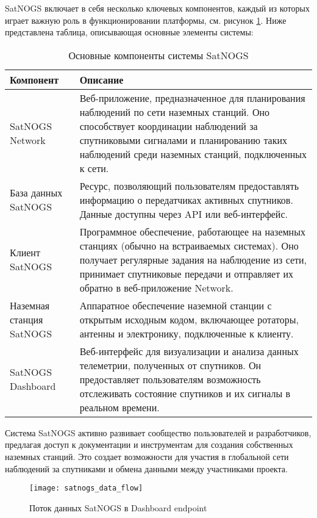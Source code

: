 SatNOGS включает в себя несколько ключевых компонентов, каждый из которых
играет важную роль в функционировании платформы, см. рисунок
\ref{fig:satnogs_data_flow}.
Ниже представлена таблица, описывающая основные элементы системы:

\begin{table}[htbp]
	\centering
	\begin{tabular}{|l|p{10cm}|}
		\hline \textbf{Компонент} & \textbf{Описание}
		\\ \hline SatNOGS Network          & Веб-приложение, предназначенное для
		планирования наблюдений по сети наземных станций. Оно способствует
		координации наблюдений за спутниковыми сигналами и планированию таких
		наблюдений среди наземных станций, подключенных к сети.                                 \\ \hline База
		данных SatNOGS            & Ресурс, позволяющий пользователям предоставлять
		информацию о передатчиках активных спутников. Данные доступны через API или
		веб-интерфейс.
		\\ \hline Клиент SatNOGS           & Программное обеспечение, работающее на
		наземных станциях (обычно на встраиваемых системах). Оно получает
		регулярные задания на наблюдение из сети, принимает спутниковые передачи и
		отправляет их обратно в веб-приложение Network.                                         \\ \hline Наземная станция
		SatNOGS                   & Аппаратное обеспечение наземной станции с открытым исходным
		кодом, включающее ротаторы, антенны и электронику, подключенные к клиенту.
		\\ \hline SatNOGS Dashboard        & Веб-интерфейс для визуализации и
		анализа данных телеметрии, полученных от спутников. Он предоставляет
		пользователям возможность отслеживать состояние спутников и их сигналы в
		реальном времени.                                                                       \\ \hline
	\end{tabular}
	\caption{Основные компоненты системы SatNOGS}
	\label{tab:satnogs_components}
\end{table}

Система SatNOGS активно развивает сообщество пользователей и разработчиков,
предлагая доступ к документации и инструментам для создания собственных
наземных станций. Это создает возможности для участия в глобальной сети
наблюдений за спутниками и обмена данными между участниками проекта.

\begin{figure}[ht]
	\centering
	\texttt{[image: satnogs\_data\_flow]}
	\caption{Поток данных SatNOGS в Dashboard endpoint}
	\label{fig:satnogs_data_flow}
\end{figure}

